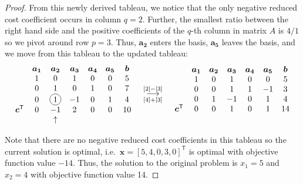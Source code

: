 \documentclass[12pt]{article}
\newcommand*\circled[1]{\tikz[baseline=(char.base)]{
            \node[shape=circle,draw,inner sep=2pt] (char) {#1};}}
\theoremstyle{definition}
\newcommand{\vect}[1]{\boldsymbol{#1}}
\newcommand{\grstep}[2][\relax]{%
   \ensuremath{\mathrel{
       {\mathop{\longrightarrow}\limits^{#2\mathstrut}_{
                                     \begin{subarray}{l} #1 \end{subarray}}}}}}
\newcommand{\tran}{\mathsf{T}}
\begin{document}
\begin{proof}
  From this newly derived tableau, we notice that the only negative reduced cost coefficient
  occurs in column $q=2$. Further, the smallest ratio between the right hand side
  and the positive coefficients of the $q$-th column in matrix $A$ is $4/1$ so we pivot
  around row $p=3$. Thus, $\vect{a_2}$ enters the basis, $\vect{a_5}$ leaves the basis,
  and we move from this tableau to the updated tableau:
  \begin{align*}
    \begin{matrix}
      & \vect{a_1} & \vect{a_2} & \vect{a_3} & \vect{a_4} & \vect{a_5} & \vect{b} \\
                       & 1 & 0 & 1 & 0 & 0 & 5 \\
                       & 0 & 1 & 0 & 1 & 0 & 7 \\
                       & 0 & \circled{1} & -1 & 0 & 1 & 4 \\
      \vect{c}^\tran & 0 & -1 & 2 & 0 & 0 & 10 \\
      & & \uparrow & & & & \\
    \end{matrix}
    \quad
    \begin{array}{c}
    \grstep[{[4] + [3]}]{[2] - [3]} \\
    \end{array}
    \quad
    \begin{matrix}
      & \vect{a_1} & \vect{a_2} & \vect{a_3} & \vect{a_4} & \vect{a_5} & \vect{b} \\
                       & 1 & 0 & 1 & 0 & 0 & 5 \\
                       & 0 & 0 & 1 & 1 & -1 & 3 \\
                       & 0 & 1 & -1 & 0 & 1 & 4 \\
      \vect{c}^\tran & 0 & 0 & 1 & 0 & 1 & 14 \\
      & & & & & & \\
    \end{matrix}
  \end{align*}

  Note that there are no negative reduced cost coefficients in this tableau so the current solution
  is optimal, i.e.\ $\vect{x} = [5, 4, 0, 3, 0]^\tran$ is optimal with objective function
  value $-14$. Thus, the solution to the original problem is $x_1 = 5$ and $x_2 = 4$
  with objective function value 14.
\end{proof}
\newpage
\end{document}
